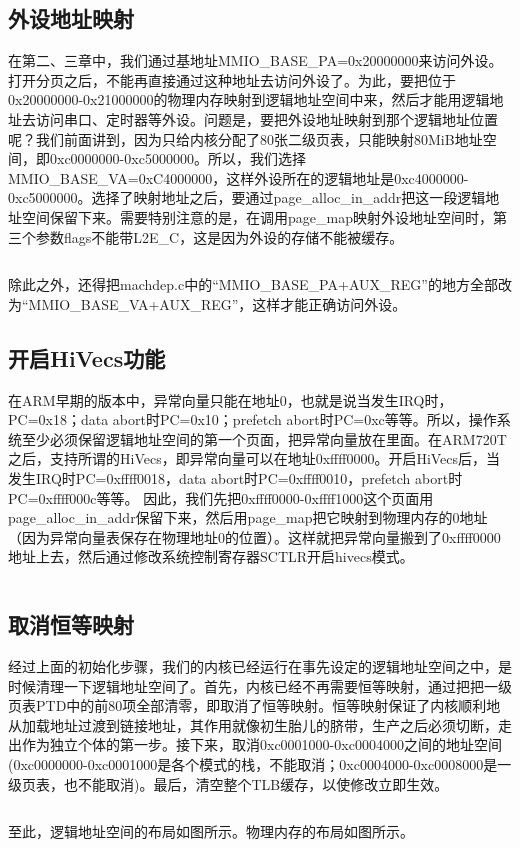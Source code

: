 \documentclass[main.tex]{subfiles}
\begin{document}
\begin{CJK*}{UTF8}{song}
\inputminted[firstline=380,lastline=394,linenos,numbersep=5pt,frame=lines,framesep=2mm]{c}{chapter04/kernel/machdep.c}

\subsection{外设地址映射}
在第二、三章中，我们通过基地址MMIO\_BASE\_PA=0x20000000来访问外设。打开分页之后，不能再直接通过这种地址去访问外设了。为此，要把位于0x20000000-0x21000000的物理内存映射到逻辑地址空间中来，然后才能用逻辑地址去访问串口、定时器等外设。问题是，要把外设地址映射到那个逻辑地址位置呢？我们前面讲到，因为只给内核分配了80张二级页表，只能映射80MiB地址空间，即0xc0000000-0xc5000000。所以，我们选择MMIO\_BASE\_VA=0xC4000000，这样外设所在的逻辑地址是0xc4000000-0xc5000000。选择了映射地址之后，要通过page\_alloc\_in\_addr把这一段逻辑地址空间保留下来。需要特别注意的是，在调用page\_map映射外设地址空间时，第三个参数flags不能带L2E\_C，这是因为外设的存储不能被缓存。

\inputminted[firstline=396,lastline=401,linenos,numbersep=5pt,frame=lines,framesep=2mm]{c}{chapter04/kernel/machdep.c}

除此之外，还得把machdep.c中的“MMIO\_BASE\_PA+AUX\_REG”的地方全部改为“MMIO\_BASE\_VA+AUX\_REG”，这样才能正确访问外设。

\subsection{开启HiVecs功能}
在ARM早期的版本中，异常向量只能在地址0，也就是说当发生IRQ时，PC=0x18；data abort时PC=0x10；prefetch abort时PC=0xc等等。所以，操作系统至少必须保留逻辑地址空间的第一个页面，把异常向量放在里面。在ARM720T之后，支持所谓的HiVecs，即异常向量可以在地址0xffff0000。开启HiVecs后，当发生IRQ时PC=0xffff0018，data abort时PC=0xffff0010，prefetch abort时PC=0xffff000c等等。
因此，我们先把0xffff0000-0xffff1000这个页面用page\_alloc\_in\_addr保留下来，然后用page\_map把它映射到物理内存的0地址（因为异常向量表保存在物理地址0的位置）。这样就把异常向量搬到了0xffff0000地址上去，然后通过修改系统控制寄存器SCTLR开启hivecs模式。

\inputminted[firstline=403,lastline=420,linenos,numbersep=5pt,frame=lines,framesep=2mm]{c}{chapter04/kernel/machdep.c}

\subsection{取消恒等映射}
经过上面的初始化步骤，我们的内核已经运行在事先设定的逻辑地址空间之中，是时候清理一下逻辑地址空间了。首先，内核已经不再需要恒等映射，通过把把一级页表PTD中的前80项全部清零，即取消了恒等映射。恒等映射保证了内核顺利地从加载地址过渡到链接地址，其作用就像初生胎儿的脐带，生产之后必须切断，走出作为独立个体的第一步。接下来，取消0xc0001000-0xc0004000之间的地址空间(0xc0000000-0xc0001000是各个模式的栈，不能取消；0xc0004000-0xc0008000是一级页表，也不能取消)。最后，清空整个TLB缓存，以使修改立即生效。

\inputminted[firstline=422,lastline=431,linenos,numbersep=5pt,frame=lines,framesep=2mm]{c}{chapter04/kernel/machdep.c}

至此，逻辑地址空间的布局如图所示。物理内存的布局如图所示。

\clearpage
\end{CJK*}
\end{document}

